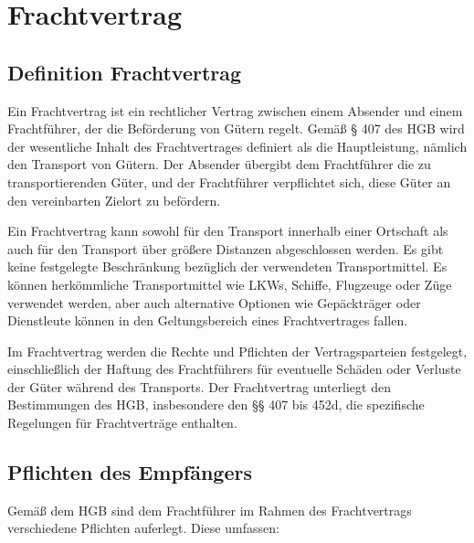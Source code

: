\chapter{Frachtvertrag}

\section[Definition]{Definition Frachtvertrag}

Ein Frachtvertrag ist ein rechtlicher Vertrag zwischen einem Absender und einem Frachtführer, der die Beförderung von Gütern regelt. Gemäß § 407 des \ac{HGB} wird der wesentliche Inhalt des Frachtvertrages definiert als die Hauptleistung, nämlich den Transport von Gütern. Der Absender übergibt dem Frachtführer die zu transportierenden Güter, und der Frachtführer verpflichtet sich, diese Güter an den vereinbarten Zielort zu befördern.

Ein Frachtvertrag kann sowohl für den Transport innerhalb einer Ortschaft als auch für den Transport über größere Distanzen abgeschlossen werden. Es gibt keine festgelegte Beschränkung bezüglich der verwendeten Transportmittel. Es können herkömmliche Transportmittel wie LKWs, Schiffe, Flugzeuge oder Züge verwendet werden, aber auch alternative Optionen wie Gepäckträger oder Dienstleute können in den Geltungsbereich eines Frachtvertrages fallen.

Im Frachtvertrag werden die Rechte und Pflichten der Vertragsparteien festgelegt, einschließlich der Haftung des Frachtführers für eventuelle Schäden oder Verluste der Güter während des Transports. Der Frachtvertrag unterliegt den Bestimmungen des \ac{HGB}, insbesondere den §§ 407 bis 452d, die spezifische Regelungen für Frachtverträge enthalten.

\section{Pflichten des Empfängers}

Gemäß dem HGB sind dem Frachtführer im Rahmen des Frachtvertrags verschiedene Pflichten auferlegt. Diese umfassen:

